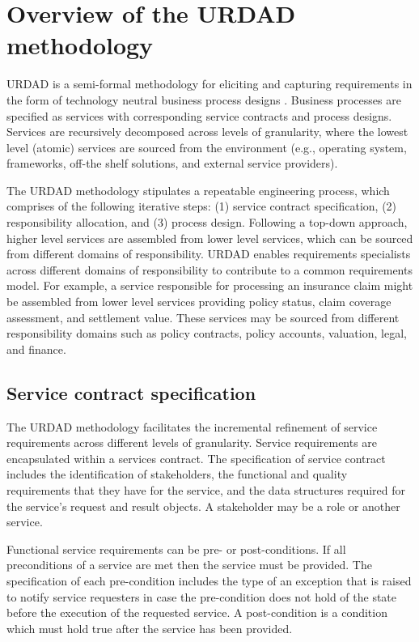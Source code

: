 \section{Overview of the URDAD methodology \label{sec:urdadMethodology}}

URDAD is a semi-formal methodology for eliciting and capturing requirements in the form of technology neutral business process designs \cite{solms_urdad_2010}. Business processes are specified as services with corresponding service contracts and process designs. Services are recursively decomposed across levels of granularity, where the lowest level (atomic) services are sourced from the environment (e.g., operating system, frameworks, off-the shelf solutions, and external service providers). 

The URDAD methodology stipulates a repeatable engineering process, which comprises of the following iterative steps: (1) service contract specification, (2) responsibility allocation, and (3) process design. Following a top-down approach, higher level services are assembled from lower level services, which can be sourced from different domains of responsibility. URDAD enables requirements specialists across different domains of responsibility to contribute to a common requirements model. For example, a service responsible for processing an insurance claim might be assembled from lower level services providing policy status, claim coverage assessment, and settlement value. These services may be sourced from different responsibility domains such as policy contracts, policy accounts, valuation, legal, and finance. 

\subsection{Service contract specification}

The URDAD methodology facilitates the incremental refinement of service requirements across different levels of granularity. Service requirements are encapsulated within a services contract. The specification of service contract includes the identification of stakeholders, the functional and quality requirements that they have for the service, and the data structures required for the service's request and result objects. A stakeholder may be a role or another service.

Functional service requirements can be pre- or post-conditions. If all preconditions of a service are met then the service must be provided. The specification of each pre-condition includes the type of an exception that is raised to notify service requesters in case the pre-condition does not hold of the state before the execution of the requested service. A post-condition is a condition which must hold true after the service has been provided.

